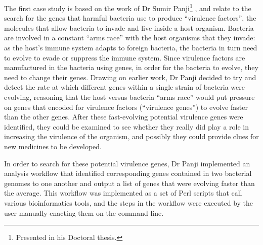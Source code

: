 \documentclass[a4paper,10pt]{scrreprt} \usepackage[utf8]{inputenc}
\begin{document}
The first case study is based on the work of Dr Sumir Panji\footnote{Presented
in his Doctoral thesis.} \cite{panji_identification_2009}, and relate to the
search for the \glspl{gene} that harmful bacteria use to produce ``virulence
factors'', the molecules that allow bacteria to invade and live inside a host
organism. Bacteria are involved in a constant ``arms race'' with the host
organisms that they invade: as the host's immune system adapts to foreign
bacteria, the bacteria in turn need to evolve to evade or suppress the immune
system. Since virulence factors are manufactured in the bacteria using
\glspl{gene}, in order for the bacteria to evolve, they need to change their
\glspl{gene}. Drawing on earlier work, Dr Panji decided to try and detect the
rate at which different \glspl{gene} within a single strain of bacteria were
evolving, reasoning that the host versus bacteria ``arms race'' would put
pressure on \glspl{gene} that encoded for virulence factors (``virulence
genes'') to evolve faster than the other \glspl{gene}. After these
fast-evolving potential virulence genes were identified, they could be examined
to see whether they really did play a role in increasing the virulence of the
organism, and possibly they could provide clues for new medicines to be
developed.

In order to search for these potential virulence genes, Dr Panji implemented an
analysis workflow that identified corresponding \glspl{gene} contained in two bacterial
genomes to one another and output a list of \glspl{gene} that were evolving faster than 
the average. This workflow was implemented as a set of Perl \cite{christiansen_programming_2012} scripts that 
call various bioinformatics tools, and the steps in the workflow were executed by the
user manually enacting them on the command line.
\end{document}
